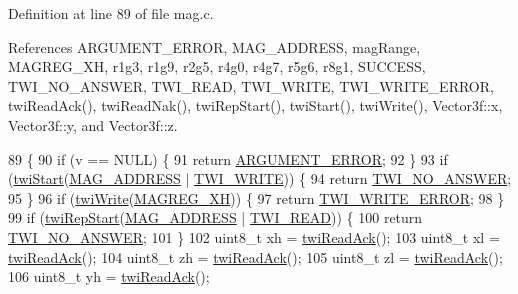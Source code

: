 Definition at line 89 of file mag.\-c.



References A\-R\-G\-U\-M\-E\-N\-T\-\_\-\-E\-R\-R\-O\-R, M\-A\-G\-\_\-\-A\-D\-D\-R\-E\-S\-S, mag\-Range, M\-A\-G\-R\-E\-G\-\_\-\-X\-H, r1g3, r1g9, r2g5, r4g0, r4g7, r5g6, r8g1, S\-U\-C\-C\-E\-S\-S, T\-W\-I\-\_\-\-N\-O\-\_\-\-A\-N\-S\-W\-E\-R, T\-W\-I\-\_\-\-R\-E\-A\-D, T\-W\-I\-\_\-\-W\-R\-I\-T\-E, T\-W\-I\-\_\-\-W\-R\-I\-T\-E\-\_\-\-E\-R\-R\-O\-R, twi\-Read\-Ack(), twi\-Read\-Nak(), twi\-Rep\-Start(), twi\-Start(), twi\-Write(), Vector3f\-::x, Vector3f\-::y, and Vector3f\-::z.


\begin{DoxyCode}
89                            \{
90     \textcolor{keywordflow}{if} (v == NULL) \{
91         \textcolor{keywordflow}{return} \hyperlink{group__error_gga2c3e4bb40f36b262a5214e2da2bca9c5a49ccf277a69dd938c591928aa27c66cc}{ARGUMENT\_ERROR};
92     \}
93     \textcolor{keywordflow}{if} (\hyperlink{group__twi_ga4f86edc73f37ce976ea2225519ab31cd}{twiStart}(\hyperlink{group__mag_gade4e63fac819c67040e374f08d2d7230}{MAG\_ADDRESS} | \hyperlink{group__twi_ga3b68e8e777b71520f9dbfac733774d5f}{TWI\_WRITE})) \{
94         \textcolor{keywordflow}{return} \hyperlink{group__error_gga2c3e4bb40f36b262a5214e2da2bca9c5a04d5943ba652af2205c88b247e0c659c}{TWI\_NO\_ANSWER};
95     \}
96     \textcolor{keywordflow}{if} (\hyperlink{group__twi_gaf42e50aaf4a9794d3a2c000e7b407887}{twiWrite}(\hyperlink{group__mag_ga84e94fce89f9ba26ff3f33621c3a63bd}{MAGREG\_XH})) \{
97         \textcolor{keywordflow}{return} \hyperlink{group__error_gga2c3e4bb40f36b262a5214e2da2bca9c5ac0e3b3463dcaf220e54794b4711708c9}{TWI\_WRITE\_ERROR};
98     \}
99     \textcolor{keywordflow}{if} (\hyperlink{group__twi_ga996e3cbbbb7239e2278bd286e61f0791}{twiRepStart}(\hyperlink{group__mag_gade4e63fac819c67040e374f08d2d7230}{MAG\_ADDRESS} | \hyperlink{group__twi_gaaf9a8abccd811954f9cc316f2b2f87b3}{TWI\_READ})) \{
100         \textcolor{keywordflow}{return} \hyperlink{group__error_gga2c3e4bb40f36b262a5214e2da2bca9c5a04d5943ba652af2205c88b247e0c659c}{TWI\_NO\_ANSWER};
101     \}
102     uint8\_t xh = \hyperlink{group__twi_ga0ab816bd0abcc24d6817f8395de7eafd}{twiReadAck}();
103     uint8\_t xl = \hyperlink{group__twi_ga0ab816bd0abcc24d6817f8395de7eafd}{twiReadAck}();
104     uint8\_t zh = \hyperlink{group__twi_ga0ab816bd0abcc24d6817f8395de7eafd}{twiReadAck}();
105     uint8\_t zl = \hyperlink{group__twi_ga0ab816bd0abcc24d6817f8395de7eafd}{twiReadAck}();
106     uint8\_t yh = \hyperlink{group__twi_ga0ab816bd0abcc24d6817f8395de7eafd}{twiReadAck}();

\end{DoxyCode}
